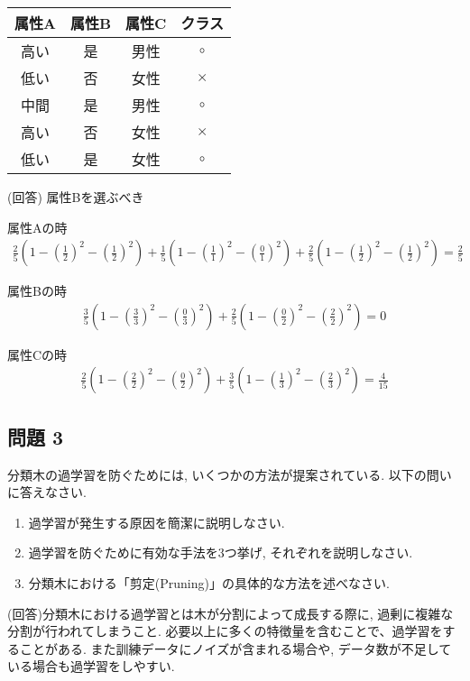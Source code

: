 \documentclass[dvipdfmx, 10pt]{jsarticle}
\begin{document}
\begin{table}[H]
    \centering
    \begin{tabular}{|c|c|c|c|}
        \hline
        属性A & 属性B & 属性C & クラス \\
        \hline
        高い & 是 & 男性 & $\circ$ \\
        低い & 否 & 女性 & $\times$ \\
        中間 & 是 & 男性 & $\circ$ \\
        高い & 否 & 女性 & $\times$ \\
        低い & 是 & 女性 & $\circ$ \\
        \hline
    \end{tabular}
\end{table}

(回答)
属性Bを選ぶべき

属性Aの時
\begin{align*}
    \frac{2}{5}(1 - (\frac{1}{2})^2 - (\frac{1}{2})^2) + 
    \frac{1}{5}(1 - (\frac{1}{1})^2 - (\frac{0}{1})^2) + 
    \frac{2}{5}(1 - (\frac{1}{2})^2 - (\frac{1}{2})^2) = \frac{2}{5}
\end{align*}

属性Bの時
\begin{align*}
    \frac{3}{5}(1 - (\frac{3}{3})^2 - (\frac{0}{3})^2) + 
    \frac{2}{5}(1 - (\frac{0}{2})^2 - (\frac{2}{2})^2) = 0 
\end{align*}

属性Cの時
\begin{align*}
    \frac{2}{5}(1 - (\frac{2}{2})^2 - (\frac{0}{2})^2) + 
    \frac{3}{5}(1 - (\frac{1}{3})^2 - (\frac{2}{3})^2) = \frac{4}{15}
\end{align*}

\subsection*{問題 3}
分類木の過学習を防ぐためには, いくつかの方法が提案されている. 以下の問いに答えなさい. 

\begin{enumerate}
    \item 過学習が発生する原因を簡潔に説明しなさい. 
    \item 過学習を防ぐために有効な手法を3つ挙げ, それぞれを説明しなさい. 
    \item 分類木における「剪定(Pruning)」の具体的な方法を述べなさい. 
\end{enumerate}

(回答)分類木における過学習とは木が分割によって成長する際に, 過剰に複雑な分割が行われてしまうこと. 
必要以上に多くの特徴量を含むことで、過学習をすることがある. 
また訓練データにノイズが含まれる場合や, データ数が不足している場合も過学習をしやすい. 
\end{document}
